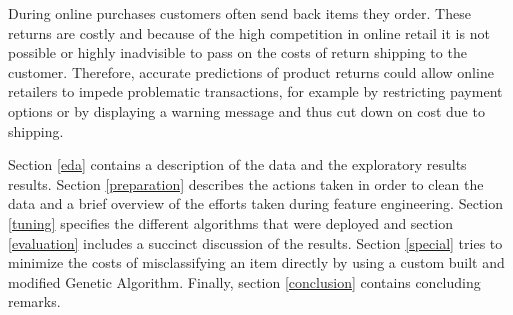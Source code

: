 During online purchases customers often send back items they order. These returns are costly and because of the high competition in online retail it is not possible or highly inadvisible to pass on the costs of return shipping to the customer. Therefore, accurate predictions of product returns could allow online retailers to impede problematic transactions, for example by restricting payment options or by displaying a warning message and thus cut down on cost due to shipping. 

Section \ref{eda} contains a description of the data and the exploratory results results. Section \ref{preparation} describes the actions taken in order to clean the data and a brief overview of the efforts taken during feature engineering. Section \ref{tuning} specifies the different algorithms that were deployed and section \ref{evaluation} includes a succinct discussion of the results. Section \ref{special} tries to minimize the costs of misclassifying an item directly by using a custom built and modified Genetic Algorithm. Finally, section \ref{conclusion} contains concluding remarks. 